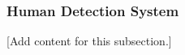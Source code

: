 
\subsubsection{Human Detection System}
\label{subsubsec:design_8_5_human_detection_system}

[Add content for this subsection.]
